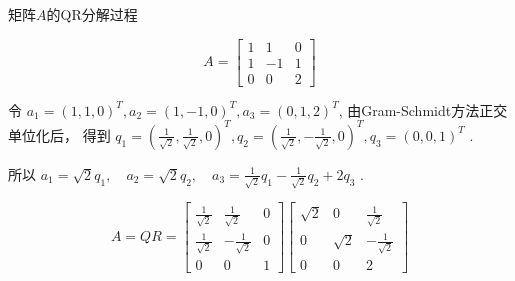 \begin{example}
    矩阵$A$的QR分解过程

    \begin{equation} A=\left[\begin{array}{ccc}1 & 1 & 0 \\ 1 & -1 & 1 \\ 0 & 0 & 2\end{array}\right] \end{equation}

    令 $ a_{1}=(1,1,0)^{T}, a_{2}=(1,-1,0)^{T}, a_{3}=(0,1,2)^{T} $, 由Gram-Schmidt方法正交单位化后， 得到 $ q_{1}=\left(\frac{1}{\sqrt{2}}, \frac{1}{\sqrt{2}}, 0\right)^{T}, q_{2}=\left(\frac{1}{\sqrt{2}},-\frac{1}{\sqrt{2}}, 0\right)^{T}, q_{3}=(0,0,1)^{T} $ .

    所以 $ a_{1}=\sqrt{2} q_{1}, \quad a_{2}=\sqrt{2} q_{2}, \quad a_{3}=\frac{1}{\sqrt{2}} q_{1}-\frac{1}{\sqrt{2}} q_{2}+2 q_{3} $ .

    \begin{equation} A=Q R=\left[\begin{array}{ccc}\frac{1}{\sqrt{2}} & \frac{1}{\sqrt{2}} & 0 \\ \frac{1}{\sqrt{2}} & -\frac{1}{\sqrt{2}} & 0 \\ 0 & 0 & 1\end{array}\right]\left[\begin{array}{ccc}\sqrt{2} & 0 & \frac{1}{\sqrt{2}} \\ 0 & \sqrt{2} & -\frac{1}{\sqrt{2}} \\ 0 & 0 & 2\end{array}\right] \end{equation}

\end{example}

